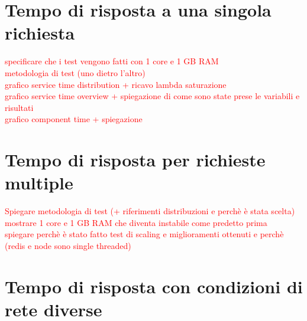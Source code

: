 \section{Tempo di risposta a una singola richiesta}

\textcolor{red}{specificare che i test vengono fatti con 1 core e 1 GB RAM\\
	metodologia di test (uno dietro l'altro)\\
	grafico service time distribution + ricavo lambda saturazione\\
	grafico service time overview + spiegazione di come sono state prese le variabili e risultati\\
	grafico component time + spiegazione}

\section{Tempo di risposta per richieste multiple}

\textcolor{red}{Spiegare metodologia di test (+ riferimenti distribuzioni e perchè è stata scelta)\\
	mostrare 1 core e 1 GB RAM che diventa instabile come predetto prima\\
	spiegare perchè è stato fatto test di scaling e miglioramenti ottenuti e perchè (redis e node sono single threaded)}

\section{Tempo di risposta con condizioni di rete diverse}

